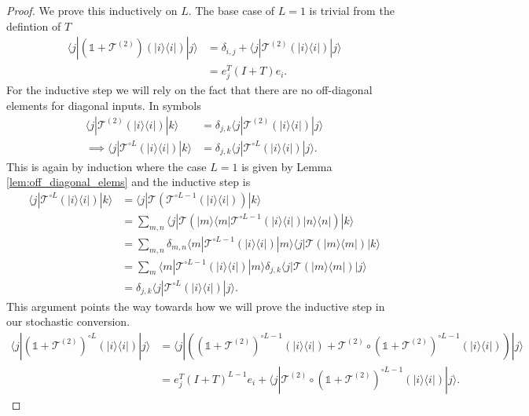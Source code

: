 \documentclass{article}
\newcommand{\ket}[1]{|#1\rangle}
\newcommand{\bra}[1]{\langle #1|}
\newcommand{\ketbra}[2]{| #1\rangle\! \langle #2|}
\newcommand{\identity}{\mathds{1}}
\begin{document}
\begin{proof}
    We prove this inductively on $L$. The base case of $L = 1$ is trivial from the defintion of $T$
    \begin{align}
    \bra{j} (\identity + \mathcal{T}^{(2)})(\ketbra{i}{i}) \ket{j} &= \delta_{i,j} + \bra{j} \mathcal{T}^{(2)}(\ketbra{i}{i}) \ket{j} \\
    &= e_j^T (I +  T) e_i.
\end{align}
For the inductive step we will rely on the fact that there are no off-diagonal elements for diagonal inputs. In symbols
\begin{align}
    \bra{j} \mathcal{T}^{(2)} (\ketbra{i}{i}) \ket{k} &= \delta_{j,k} \bra{j} \mathcal{T}^{(2)} (\ketbra{i}{i}) \ket{j} \\
    \implies \bra{j} \mathcal{T}^{\circ L} (\ketbra{i}{i}) \ket{k} &= \delta_{j,k} \bra{j} \mathcal{T}^{\circ L} (\ketbra{i}{i}) \ket{j}.
\end{align}
This is again by induction where the case $L = 1$ is given by Lemma \ref{lem:off_diagonal_elems} and the inductive step is 
\begin{align}
    \bra{j} \mathcal{T}^{\circ L} (\ketbra{i}{i}) \ket{k} &= \bra{j} \mathcal{T} \left( \mathcal{T}^{\circ L - 1} (\ketbra{i}{i}) \right) \ket{k} \\
    &= \sum_{m, n} \bra{j} \mathcal{T}\left( \ketbra{m}{m}\mathcal{T}^{\circ L - 1}(\ketbra{i}{i}) \ketbra{n}{n}\right) \ket{k} \\
    &= \sum_{m, n} \delta_{m,n} \bra{m}\mathcal{T}^{\circ L - 1}(\ketbra{i}{i}) \ket{m} \bra{j} \mathcal{T}\left(   \ketbra{m}{m} \right) \ket{k} \\
    &= \sum_{m} \bra{m}\mathcal{T}^{\circ L - 1}(\ketbra{i}{i}) \ket{m} \delta_{j,k} \bra{j} \mathcal{T}\left(   \ketbra{m}{m} \right) \ket{j} \\
    &= \delta_{j,k} \bra{j} \mathcal{T}^{\circ L} (\ketbra{i}{i}) \ket{j}.
\end{align} 
This argument points the way towards how we will prove the inductive step in our stochastic conversion. 
\begin{align}
    \bra{j} (\identity + \mathcal{T}^{(2)})^{\circ L}(\ketbra{i}{i}) \ket{j} &= \bra{j} \left( (\identity + \mathcal{T}^{(2)})^{\circ L - 1} (\ketbra{i}{i}) + \mathcal{T}^{(2)} \circ (\identity + \mathcal{T}^{(2)})^{\circ L - 1} (\ketbra{i}{i}) \right)\ket{j} \\
    &= e_j^T (I + T)^{L - 1} e_i + \bra{j} \mathcal{T}^{(2)} \circ (\identity + \mathcal{T}^{(2)})^{\circ L - 1} (\ketbra{i}{i}) \ket{j} . \label{eq:matrix_reloaded1}

\end{align}
\end{proof}
\end{document}
